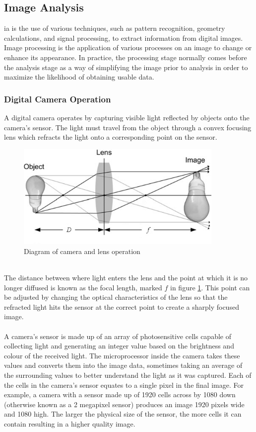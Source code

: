 \subsection{Image Analysis}
	\gls{ia} is the use of various techniques, such as pattern recognition, geometry calculations, and signal processing, to extract information from digital images. Image processing is the application of various processes on an image to change or enhance its appearance. In practice, the processing stage normally comes before the analysis stage as a way of simplifying the image prior to analysis in order to maximize the likelihood of obtaining usable data.
	\subsubsection{Digital Camera Operation}
		A digital camera operates by capturing visible light reflected by objects onto the camera’s sensor. The light must travel from the object through a convex focusing lens which refracts the light onto a corresponding point on the sensor.
		\begin{figure}[h!]
			\centering
			\includegraphics[width=10cm]{../images/camera_bulb.PNG}
			\caption[Diagram of camera and lens operation]{Diagram of camera and lens operation \citep{introtoprocessing}}
			\label{fig:camera_diagram}
		\end{figure}
		\\
		The distance between where light enters the lens and the point at which it is no longer diffused is known as the focal length, marked $f$ in figure \ref{fig:camera_diagram}. This point can be adjusted by changing the optical characteristics of the lens so that the refracted light hits the sensor at the correct point to create a sharply focused image.
		\\\\
		A camera’s sensor is made up of an array of photosensitive cells capable of collecting light and generating an integer value based on the brightness and colour of the received light. The microprocessor inside the camera takes these values and converts them into the image data, sometimes taking an average of the surrounding values to better understand the light as it was captured. Each of the cells in the camera’s sensor equates to a single pixel in the final image. For example, a camera with a sensor made up of 1920 cells across by 1080 down (otherwise known as a 2 megapixel sensor) produces an image 1920 pixels wide and 1080 high. The larger the physical size of the sensor, the more cells it can contain resulting in a higher quality image.
